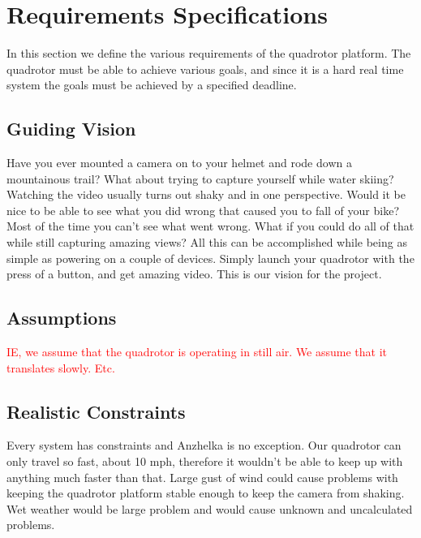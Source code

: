 \documentclass{article}
\numberwithin{equation}{section} %
\begin{document}
\section{Requirements Specifications}
In this section we define the various requirements of the quadrotor platform. The quadrotor must be able to achieve various goals, and since it is a hard real time system the goals must be achieved by a specified deadline.


\subsection{Guiding Vision}
Have you ever mounted a camera on to your helmet and rode down a mountainous trail? What about trying to capture yourself while water skiing? Watching the video usually turns out shaky and in one perspective. Would it be nice to be able to see what you did wrong that caused you to fall of your bike? Most of the time you can't see what went wrong. What if you could do all of that while still capturing amazing views?  All this can be accomplished while being as simple as powering on a couple of devices. Simply launch your quadrotor with the press of a button, and get amazing video. This is our vision for the project.

\subsection{Assumptions}
\textcolor{red}{IE, we assume that the quadrotor is operating in still air. We assume that it translates slowly. Etc.}

\subsection{Realistic Constraints}
Every system has constraints and Anzhelka is no exception. Our quadrotor can only travel so fast, about 10 mph, therefore it wouldn't be able to keep up with anything much faster than that. Large gust of wind could cause problems with keeping the quadrotor platform stable enough to keep the camera from shaking. Wet weather would be large problem and would cause unknown and uncalculated problems.
\end{document}
